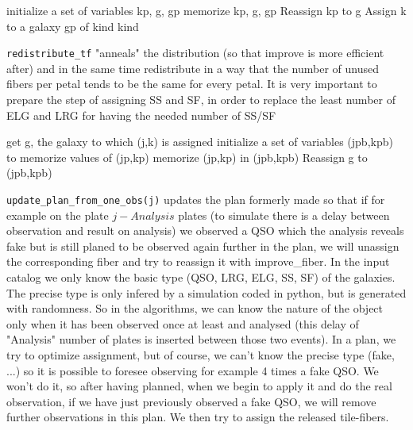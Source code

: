 \documentclass{article}
\begin{document}
\begin{algorithm}[H]
	\caption{Improve\_from\_kind (kind,j0,n)}\label{euclid}
	\begin{algorithmic}[1]
		\State initialize a set of variables kp, g, gp
		\State memorize kp, g, gp
		\EndIf
		\EndFor
		\EndFor
		\State Reassign kp to g
		\State Assign k to a galaxy gp of kind kind
		\EndIf
		\EndFor
		\EndFor
		\EndFor
	\end{algorithmic}
\end{algorithm}

{\tt redistribute\_tf} "anneals" the distribution (so that improve is more efficient after) and in the same time redistribute in a way that the number of unused fibers per petal tends to be the same for every petal. It is very important to prepare the step of assigning SS and SF, in order to replace the least number of ELG and LRG for having the needed number of SS/SF

\begin{algorithm}[H]
	\caption{redistribute\_tf(j0,n)}\label{redis}
	\begin{algorithmic}[1]
		\State get g, the galaxy to which (j,k) is assigned
		\State initialize a set of variables (jpb,kpb) to memorize values of (jp,kp)
		\State memorize (jp,kp) in (jpb,kpb)
		\EndIf
		\EndFor
		\State Reassign g to (jpb,kpb)
		\EndIf
		\EndFor
		\EndFor
	\end{algorithmic}
\end{algorithm}


{\tt update\_plan\_from\_one\_obs(j)} updates the plan formerly made so that if for example on the plate $j-Analysis$ plates (to simulate there is a delay between observation and result on analysis) we observed a QSO which the analysis reveals fake but is still planed to be observed again further in the plan, we will unassign the corresponding fiber and try to reassign it with improve\_fiber.
In the input catalog we only know the basic type (QSO, LRG, ELG, SS, SF) of the galaxies. The precise type is only infered by a simulation coded in python, but is generated with randomness. So in the algorithms, we can know the nature of the object only when it has been observed once at least and analysed (this delay of "Analysis" number of plates is inserted between those two events). In a plan, we try to optimize assignment, but of course, we can't know the precise type (fake, ...) so it is possible to foresee observing for example 4 times a fake QSO. We won't do it, so after having planned, when we begin to apply it and do the real observation, if we have just previously observed a fake QSO, we will remove further observations in this plan. We then try to assign the released tile-fibers.
\end{document}
